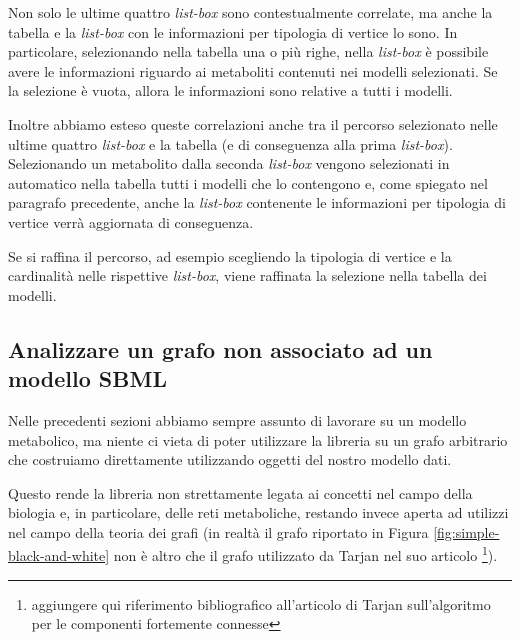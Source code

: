 Non solo le ultime quattro \emph{list-box} sono contestualmente
correlate, ma anche la tabella e la \emph{list-box} con le
informazioni per tipologia di vertice lo sono. In particolare,
selezionando nella tabella una o pi\`u righe, nella \emph{list-box}
\`e possibile avere le informazioni riguardo ai metaboliti contenuti
nei modelli selezionati. Se la selezione \`e vuota, allora le
informazioni sono relative a tutti i modelli.

Inoltre abbiamo esteso queste correlazioni anche tra il percorso
selezionato nelle ultime quattro \emph{list-box} e la tabella (e di
conseguenza alla prima \emph{list-box}). Selezionando un metabolito
dalla seconda \emph{list-box} vengono selezionati in automatico nella
tabella tutti i modelli che lo contengono e, come spiegato nel
paragrafo precedente, anche la \emph{list-box} contenente le
informazioni per tipologia di vertice verr\`a aggiornata di
conseguenza.

Se si raffina il percorso, ad esempio scegliendo la tipologia di
vertice e la cardinalit\`a nelle rispettive \emph{list-box}, viene
raffinata la selezione nella tabella dei modelli.

\subsection{Analizzare un grafo non associato ad un modello SBML}
Nelle precedenti sezioni abbiamo sempre assunto di lavorare su un
modello metabolico, ma niente ci vieta di poter utilizzare la libreria
su un grafo arbitrario che costruiamo direttamente utilizzando oggetti
del nostro modello dati.

Questo rende la libreria non strettamente legata ai concetti nel campo
della biologia e, in particolare, delle reti metaboliche, restando
invece aperta ad utilizzi nel campo della teoria dei grafi (in
realt\`a il grafo riportato in Figura \ref{fig:simple-black-and-white}
non \`e altro che il grafo utilizzato da Tarjan nel suo articolo
\footnote{aggiungere qui riferimento bibliografico all'articolo di
  Tarjan sull'algoritmo per le componenti fortemente connesse}).


